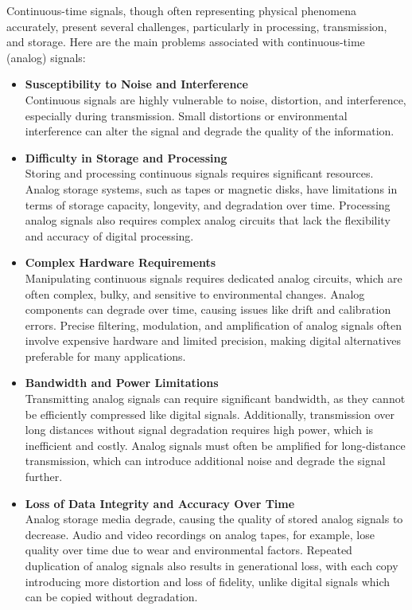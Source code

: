 \documentclass[12pt,a4paper]{report}
\begin{document}
Continuous-time signals, though often representing physical phenomena accurately, present several challenges, particularly in processing, transmission, and storage. Here are the main problems associated with continuous-time (analog) signals:

\begin{itemize}
    \item \textbf{Susceptibility to Noise and Interference}\\
    Continuous signals are highly vulnerable to noise, distortion, and interference, especially during transmission. Small distortions or environmental interference can alter the signal and degrade the quality of the information.
    
    \item \textbf{Difficulty in Storage and Processing}\\
    Storing and processing continuous signals requires significant resources. Analog storage systems, such as tapes or magnetic disks, have limitations in terms of storage capacity, longevity, and degradation over time. Processing analog signals also requires complex analog circuits that lack the flexibility and accuracy of digital processing.
    
    \item \textbf{Complex Hardware Requirements}\\
    Manipulating continuous signals requires dedicated analog circuits, which are often complex, bulky, and sensitive to environmental changes. Analog components can degrade over time, causing issues like drift and calibration errors. Precise filtering, modulation, and amplification of analog signals often involve expensive hardware and limited precision, making digital alternatives preferable for many applications.
    
    \item \textbf{Bandwidth and Power Limitations}\\
    Transmitting analog signals can require significant bandwidth, as they cannot be efficiently compressed like digital signals. Additionally, transmission over long distances without signal degradation requires high power, which is inefficient and costly. Analog signals must often be amplified for long-distance transmission, which can introduce additional noise and degrade the signal further.
    
    \item \textbf{Loss of Data Integrity and Accuracy Over Time}\\
    Analog storage media degrade, causing the quality of stored analog signals to decrease. Audio and video recordings on analog tapes, for example, lose quality over time due to wear and environmental factors. Repeated duplication of analog signals also results in generational loss, with each copy introducing more distortion and loss of fidelity, unlike digital signals which can be copied without degradation.
\end{itemize}
\end{document}
